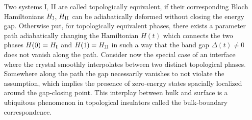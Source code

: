 Two systems I, II are called topologically equivalent, if their corresponding Bloch Hamiltonians $H_{\rm I}$, $H_{\rm II}$ can be adiabatically deformed without closing the energy gap.
Otherwise put, for topologically equivalent phases, there exists a parameter path adiabatically changing the Hamiltonian $H({t})$ which connects the two phases $H({0})=H_{\rm I}$ and $H({1})=H_{\rm II}$ in such a way that the band gap $\Delta(t)\neq0$ does not vanish along the path.
Consider now the special case of an interface where the crystal smoothly interpolates between two distinct topological phases.
Somewhere along the path the gap necessarily vanishes to not violate the assumption, which implies the presence of zero-energy states spacially localized around the gap-closing point.
This interplay between bulk and surface is a ubiquitous phenomenon in topological insulators called the bulk-boundary correspondence.

